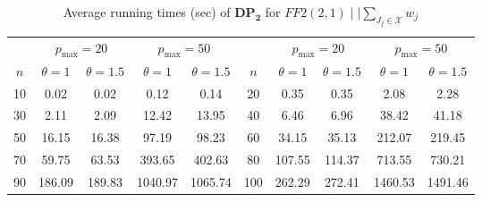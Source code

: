 \documentclass[12pt, eqno, limlimits]{article}
\begin{document}
\begin{sloppypar}
        \begin{table}[htpb]
            \footnotesize  
            \setlength{\tabcolsep}{2 pt} %
            \caption{Average running times (sec) of $\mathbf{DP_2}$ for $FF2(2, 1)\mid  \mid \sum_{J_j \in \mathcal{X}} w_j$}  \label{TA-FF21}
            \vspace{-10pt} 
            \begin{center}
                \begin{tabular}{cccccccccc}  \hline	
                    {} & \multicolumn{2}{c}{$p_{\max}=20$} & \multicolumn{2}{c}{$p_{\max}=50$} & {} & \multicolumn{2}{c}{$p_{\max}=20$} & \multicolumn{2}{c}{$p_{\max}=50$}\\ 
                    \cmidrule(lr){2-3} \cmidrule(lr){4-5} \cmidrule(lr){7-8} \cmidrule(lr){9-10}
                    $n$ & $\theta=1$ & $\theta=1.5$ & $\theta=1$ & $\theta=1.5$ & $n$ & $\theta=1$ & $\theta=1.5$ &  $\theta=1$  & $\theta=1.5$\\ 
                    10 & 0.02 & 0.02 & 0.12 & 0.14 & 20 & 0.35 & 0.35 & 2.08 & 2.28 \\
                    30 & 2.11 & 2.09 & 12.42 & 13.95 & 40 & 6.46 & 6.96 & 38.42 & 41.18 \\ 
                    50 & 16.15 & 16.38 & 97.19 & 98.23 & 60 & 34.15 & 35.13 & 212.07 & 219.45 \\
                    70 & 59.75 & 63.53 & 393.65 & 402.63 & 80 &	107.55 & 114.37 & 713.55 & 730.21 \\
                    90 & 186.09 & 189.83 & 1040.97 & 1065.74 & 100 & 262.29 & 272.41 & 1460.53 & 1491.46\\ \hline 	
                \end{tabular}
            \end{center} 
        \end{table}
        

\end{sloppypar}
\end{document}
